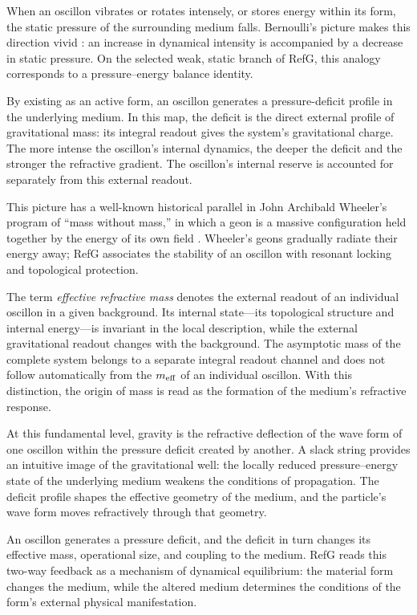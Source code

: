 \documentclass[11pt,a4paper]{article}
\begin{document}
When an oscillon vibrates or rotates intensely, or stores energy within its form, the static pressure of the surrounding medium falls. Bernoulli's picture makes this direction vivid \citep{bernoulli1738}: an increase in dynamical intensity is accompanied by a decrease in static pressure. On the selected weak, static branch of RefG, this analogy corresponds to a pressure--energy balance identity.

By existing as an active form, an oscillon generates a pressure-deficit profile in the underlying medium. In this map, the deficit is the direct external profile of gravitational mass: its integral readout gives the system's gravitational charge. The more intense the oscillon's internal dynamics, the deeper the deficit and the stronger the refractive gradient. The oscillon's internal reserve is accounted for separately from this external readout.

This picture has a well-known historical parallel in John Archibald Wheeler's program of ``mass without mass,'' in which a geon is a massive configuration held together by the energy of its own field \citep{wheeler1955}. Wheeler's geons gradually radiate their energy away; RefG associates the stability of an oscillon with resonant locking and topological protection.

The term \emph{effective refractive mass} denotes the external readout of an individual oscillon in a given background. Its internal state---its topological structure and internal energy---is invariant in the local description, while the external gravitational readout changes with the background. The asymptotic mass of the complete system belongs to a separate integral readout channel and does not follow automatically from the $m_{\rm eff}$ of an individual oscillon. With this distinction, the origin of mass is read as the formation of the medium's refractive response.

At this fundamental level, gravity is the refractive deflection of the wave form of one oscillon within the pressure deficit created by another. A slack string provides an intuitive image of the gravitational well: the locally reduced pressure--energy state of the underlying medium weakens the conditions of propagation. The deficit profile shapes the effective geometry of the medium, and the particle's wave form moves refractively through that geometry.

An oscillon generates a pressure deficit, and the deficit in turn changes its effective mass, operational size, and coupling to the medium. RefG reads this two-way feedback as a mechanism of dynamical equilibrium: the material form changes the medium, while the altered medium determines the conditions of the form's external physical manifestation.
\end{document}
